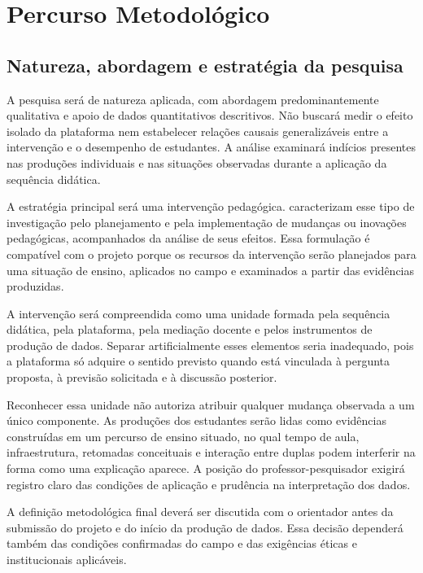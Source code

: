 \chapter{Percurso Metodológico}

\section{Natureza, abordagem e estratégia da pesquisa}

A pesquisa será de natureza aplicada, com abordagem predominantemente qualitativa e apoio de dados quantitativos descritivos. Não buscará medir o efeito isolado da plataforma nem estabelecer relações causais generalizáveis entre a intervenção e o desempenho de estudantes. A análise examinará indícios presentes nas produções individuais e nas situações observadas durante a aplicação da sequência didática.

A estratégia principal será uma intervenção pedagógica.  caracterizam esse tipo de investigação pelo planejamento e pela implementação de mudanças ou inovações pedagógicas, acompanhados da análise de seus efeitos. Essa formulação é compatível com o projeto porque os recursos da intervenção serão planejados para uma situação de ensino, aplicados no campo e examinados a partir das evidências produzidas.

A intervenção será compreendida como uma unidade formada pela sequência didática, pela plataforma, pela mediação docente e pelos instrumentos de produção de dados. Separar artificialmente esses elementos seria inadequado, pois a plataforma só adquire o sentido previsto quando está vinculada à pergunta proposta, à previsão solicitada e à discussão posterior.

Reconhecer essa unidade não autoriza atribuir qualquer mudança observada a um único componente. As produções dos estudantes serão lidas como evidências construídas em um percurso de ensino situado, no qual tempo de aula, infraestrutura, retomadas conceituais e interação entre duplas podem interferir na forma como uma explicação aparece. A posição do professor-pesquisador exigirá registro claro das condições de aplicação e prudência na interpretação dos dados.

A definição metodológica final deverá ser discutida com o orientador antes da submissão do projeto e do início da produção de dados. Essa decisão dependerá também das condições confirmadas do campo e das exigências éticas e institucionais aplicáveis.

